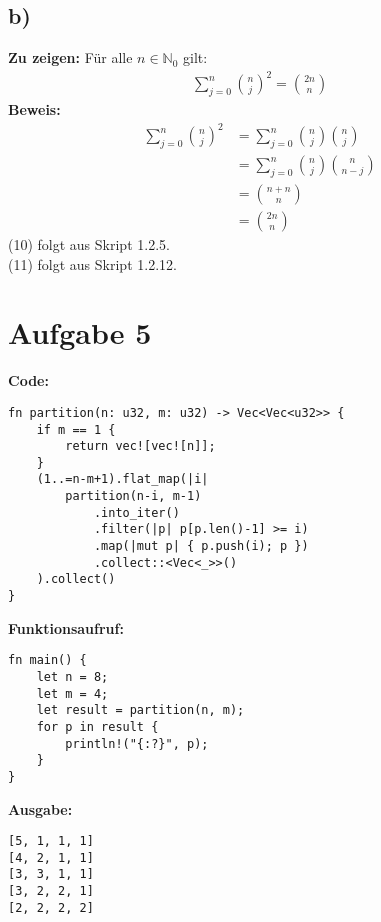 \documentclass[a4paper]{scrartcl}
\begin{document}
\subsection*{b)}
\textbf{Zu zeigen:} Für alle $ n \in \mathbb{N}_0$ gilt:
\begin{align*}
    \sum_{j=0}^{n} \binom{n}{j}^2 = \binom{2n}{n}
\end{align*}
\textbf{Beweis:} 
\begin{align}
    \sum_{j=0}^{n} \binom{n}{j}^2 &= \sum_{j=0}^{n} \binom{n}{j} \binom{n}{j} \\
    &= \sum_{j=0}^{n} \binom{n}{j} \binom{n}{n-j} \\
    &= \binom{n+n}{n} \\
    &= \binom{2n}{n}
\end{align}
(10) folgt aus Skript 1.2.5. \\
(11) folgt aus Skript 1.2.12. 


\newpage
\section*{Aufgabe 5}
\textbf{Code:}
\begin{lstlisting}
fn partition(n: u32, m: u32) -> Vec<Vec<u32>> {
    if m == 1 {
        return vec![vec![n]];
    }
    (1..=n-m+1).flat_map(|i| 
        partition(n-i, m-1)
            .into_iter()
            .filter(|p| p[p.len()-1] >= i)
            .map(|mut p| { p.push(i); p })
            .collect::<Vec<_>>()
    ).collect()
}
\end{lstlisting}
\textbf{Funktionsaufruf:}
\begin{lstlisting}
fn main() {
    let n = 8;
    let m = 4;
    let result = partition(n, m);
    for p in result {
        println!("{:?}", p);
    }
}
\end{lstlisting}

\textbf{Ausgabe:}
\begin{lstlisting}
[5, 1, 1, 1]
[4, 2, 1, 1]
[3, 3, 1, 1]
[3, 2, 2, 1]
[2, 2, 2, 2]
\end{lstlisting}
\end{document}
